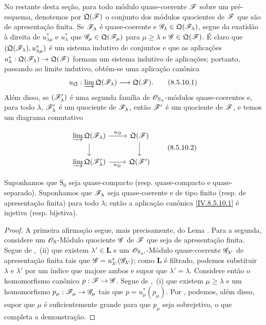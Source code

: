 \begin{env}[8.5.10]
\label{IV.8.5.10}
No restante desta seção, para todo módulo quase-coerente $\mathscr{F}$ sobre um pré-esquema, denotemos por $\mathfrak{Q}(\mathscr{F})$ o conjunto dos módulos quocientes de $\mathscr{F}$ que são de apresentação finita. Se $\mathscr{F}_\lambda$ é quase-coerente e $\mathscr{G}_\lambda\in\mathfrak{Q}(\mathscr{F}_\lambda)$, segue da exatidão à direita de $u_{\lambda\mu}^*$ e $u_\lambda^*$ que $\mathscr{G}_\mu\in\mathfrak{Q}(\mathscr{F}_\mu)$ para $\mu\geqslant\lambda$ e $\mathscr{G}\in\mathfrak{Q}(\mathscr{F})$. É claro que $(\mathfrak{Q}(\mathscr{F}_\lambda),u_{\lambda\mu}^*)$ é um sistema indutivo de conjuntos e que as aplicações $u_\lambda^*:\mathfrak{Q}(\sh{F}_\lambda)\to\mathfrak{Q}(\sh{F})$ formam um sistema indutivo de aplicações; portanto, passando ao limite indutivo, obtém-se uma aplicação canônica
\[
u_{\mathfrak{Q}}:\varinjlim\mathfrak{Q}(\sh{F}_\lambda)\longrightarrow\mathfrak{Q}(\sh{F}).
\tag{8.5.10.1}\label{IV.8.5.10.1}
\]
Além disso, se $(\mathscr{F}'_\lambda)$ é uma segunda família de $\mathscr{O}_{\mathrm{S}_\lambda}$-módulos quase-coerentes e, para todo $\lambda$, $\mathscr{F}'_\lambda$ é um quociente de $\mathscr{F}_\lambda$, então $\mathscr{F}'$ é um quociente de $\mathscr{F}$, e temos um diagrama comutativo


\[
\begin{tikzcd}
\varinjlim\mathfrak{Q}(\sh{F}_\lambda) \ar[r,"u_{\mathfrak{Q}}"] \ar[d] & \mathfrak{Q}(\sh{F}) \ar[d] \\
\varinjlim\mathfrak{Q}(\sh{F}'_\lambda) \ar[r,"u_{\mathfrak{Q}}"'] & \mathfrak{Q}(\sh{F}')
\end{tikzcd}
\tag{8.5.10.2}\label{IV.8.5.10.2}
\]
\end{env}

\begin{proposition}[8.5.11]
\label{IV.8.5.11}
Suponhamos que $\mathrm{S}_0$ seja quase-compacto (resp. quase-compacto e quase-separado). Suponhamos que $\mathscr{F}_\lambda$ seja quase-coerente e de tipo finito (resp. de apresentação finita) para todo $\lambda$; então a aplicação canônica \eqref{IV.8.5.10.1} é injetiva (resp. bijetiva).
\end{proposition}

\begin{proof}
A primeira afirmação segue, mais precisamente, do Lema . Para a segunda, considere um $\mathscr{O}_{\mathrm{S}}$-Módulo quociente $\mathscr{G}$ de $\mathscr{F}$ que seja de apresentação finita. Segue de ,~(ii) que existem $\lambda'\in\mathbf{L}$ e um $\mathscr{O}_{\mathrm{S}_{\lambda'}}$-Módulo quase-coerente $\mathscr{G}_{\lambda'}$ de apresentação finita tais que $\mathscr{G}=u_{\lambda'}^*(\mathscr{G}_{\lambda'})$; como $\mathbf{L}$ é filtrado, podemos substituir $\lambda$ e $\lambda'$ por um índice que majore ambos e supor que $\lambda'=\lambda$. Considere então o homomorfismo canônico $p:\sh{F}\to\sh{G}$. Segue de ,~(i) que existem $\mu\geqslant\lambda$ e um homomorfismo $p_\mu:\sh{F}_\mu\to\sh{G}_\mu$ tais que $p=u_\mu^*(p_\mu)$. Por , podemos, além disso, supor que $\mu$ é suficientemente grande para que $p_\mu$ seja sobrejetivo, o que completa a demonstração.
\end{proof}

